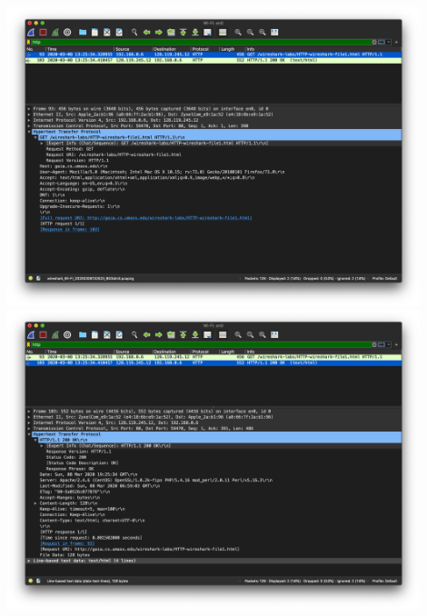 \documentclass{article}
\begin{document}
\begin{enumerate}
\includegraphics[width=0.90\textwidth]{lab2_part1_get}\\
\includegraphics[width=0.90\textwidth]{lab2_part1_response}
\end{enumerate}
\end{document}
